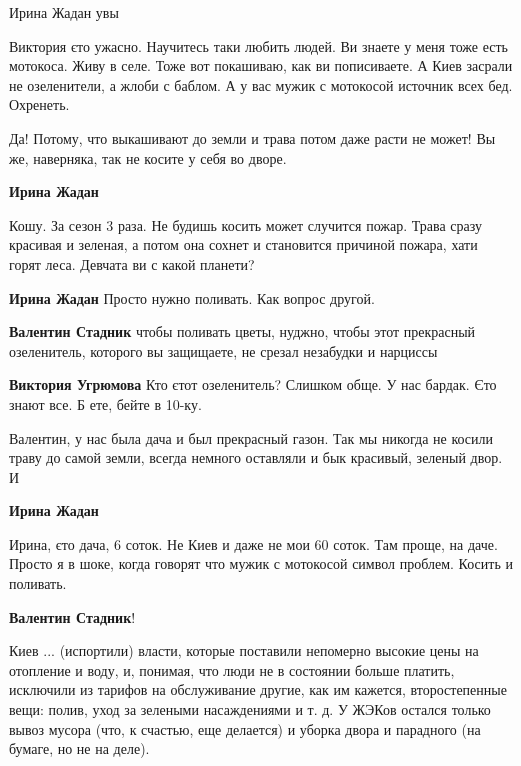 \begin{itemize}
\begin{itemize}
Ирина Жадан увы
\end{itemize} %


Виктория єто ужасно. Научитесь таки любить людей. Ви знаете у меня тоже есть
мотокоса. Живу в селе. Тоже вот покашиваю, как ви пописиваете. А Киев засрали не
озеленители, а жлоби с баблом. А у вас мужик с мотокосой источник всех
бед. Охренеть.

\begin{itemize} %
Да! Потому, что выкашивают до земли и трава потом даже расти не может! Вы же, наверняка, так не косите у себя во дворе.

\begin{itemize} %
\textbf{Ирина Жадан} 

Кошу. За сезон 3 раза. Не будишь косить может случится пожар. Трава сразу красивая
и зеленая, а потом она сохнет и становится причиной пожара, хати горят
леса. Девчата ви с какой планети?


\textbf{Ирина Жадан} Просто нужно поливать. Как вопрос другой.

\textbf{Валентин Стадник} чтобы поливать цветы, нуджно, чтобы этот прекрасный озеленитель, которого вы защищаете, не срезал незабудки и нарциссы

\textbf{Виктория Угрюмова} Кто єтот озеленитель? Слишком обще. У нас бардак. Єто знают все. Б ете, бейте в 10-ку.
\end{itemize} %


Валентин, у нас была дача и был прекрасный газон. Так мы никогда не косили
траву до самой земли, всегда немного оставляли и бык красивый, зеленый двор. И

\begin{itemize} %
\textbf{Ирина Жадан} 

Ирина, єто дача, 6 соток. Не Киев и даже не мои 60 соток. Там проще, на даче. Просто
я в шоке, когда говорят что мужик с мотокосой символ проблем. Косить и поливать.

\end{itemize} %

\textbf{Валентин Стадник}! 

Киев ... (испортили) власти, которые поставили непомерно высокие цены на
отопление и воду, и, понимая, что люди не в состоянии больше платить, исключили
из тарифов на обслуживание другие, как им кажется, второстепенные вещи: полив,
уход за зелеными насаждениями и т. д. У ЖЭКов остался только вывоз мусора (что,
к счастью, еще делается) и уборка двора и парадного (на бумаге, но не на деле).


\end{itemize}
\end{itemize}
